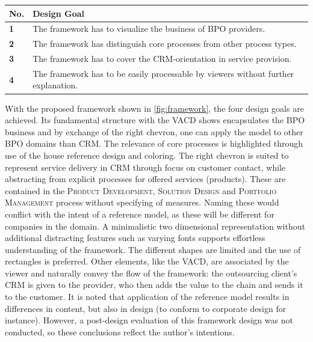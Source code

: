 	 	 	\begin{table}[caption={Design Goals}, label={tab:desobj}]
	 	\centering
	 	\begin{tabular}{l p{13.3cm}}
	 		
	 		\textbf{No. }&\textbf{ Design Goal}
	 		\\ \hline
	 		\textbf{1 }                        & The framework has to visualize the business of BPO providers.                                     \\ \hline
	 		\textbf{2}                         & The framework has distinguish core processes from other process types.                                                                                                                   \\ \hline
	 		\textbf{3 }                        & The framework has to cover the CRM-orientation in service provision. \\ \hline
	 		\textbf{4}                         & The framework has to be easily processable by viewers without further explanation.                                                              
	 		
	 	\end{tabular}
	 \end{table}
 
	 
	 With the proposed framework shown in \Fig \ref{fig:framework}, the four design goals are achieved. Its fundamental structure with the \acrshort{VACD} shows encapsulates the BPO business and by exchange of the right chevron, one can apply the model to other BPO domains than \acrshort{CRM}. The relevance of core processes is highlighted through use of the house reference design and coloring. The right chevron is suited to represent service delivery in \acrshort{CRM} through focus on customer contact, while abstracting from explicit processes for offered services (products). These are contained in the \textsc{Product Development}, \textsc{Solution Design} and \textsc{Portfolio Management} process without specifying of measures. Naming these would conflict with the intent of a reference model, as these will be different for companies in the domain. A minimalistic two dimensional representation without additional distracting features such as  varying fonts supports effortless understanding of the framework. The different shapes are limited and the use of rectangles is preferred. Other elements, like the \acrshort{VACD}, are associated by the viewer and naturally convey the flow of the framework: the outsourcing client's \acrshort{CRM} is given to the provider, who then adds the value to the chain and sends it to the customer. It is noted that application of the reference model results in differences in content, but also in design (to conform to corporate design for instance). However, a post-design evaluation of this framework design was not conducted, so these conclusions reflect the author's intentions.
	 
